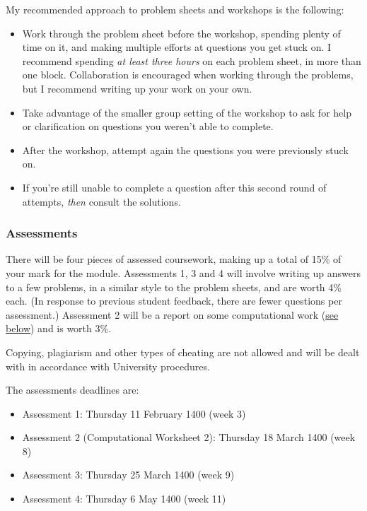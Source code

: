 \documentclass[
  a4paper,
]{article}
\providecommand{\tightlist}{%
  \setlength{\itemsep}{0pt}\setlength{\parskip}{0pt}}
\theoremstyle{definition}
\theoremstyle{definition}
\theoremstyle{definition}
\theoremstyle{remark}
\begin{document}
My recommended approach to problem sheets and workshops is the following:

\begin{itemize}
\tightlist
\item
  Work through the problem sheet before the workshop, spending plenty of time on it, and making multiple efforts at questions you get stuck on. I recommend spending \emph{at least three hours} on each problem sheet, in more than one block. Collaboration is encouraged when working through the problems, but I recommend writing up your work on your own.
\item
  Take advantage of the smaller group setting of the workshop to ask for help or clarification on questions you weren't able to complete.
\item
  After the workshop, attempt again the questions you were previously stuck on.
\item
  If you're still unable to complete a question after this second round of attempts, \emph{then} consult the solutions.
\end{itemize}

\hypertarget{assessments}{%
\subsubsection*{Assessments}\label{assessments}}

There will be four pieces of assessed coursework, making up a total of 15\% of your mark for the module. Assessments 1, 3 and 4 will involve writing up answers to a few problems, in a similar style to the problem sheets, and are worth 4\% each. (In response to previous student feedback, there are fewer questions per assessment.) Assessment 2 will be a report on some computational work (\protect\hyperlink{about--computing}{see below}) and is worth 3\%.

Copying, plagiarism and other types of cheating are not allowed and will be dealt with in accordance with University procedures.

The assessments deadlines are:

\begin{itemize}
\tightlist
\item
  Assessment 1: Thursday 11 February 1400 (week 3)
\item
  Assessment 2 (Computational Worksheet 2): Thursday 18 March 1400 (week 8)
\item
  Assessment 3: Thursday 25 March 1400 (week 9)
\item
  Assessment 4: Thursday 6 May 1400 (week 11)
\end{itemize}
\end{document}
